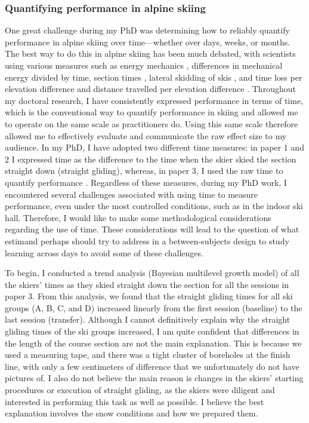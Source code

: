 \subsubsection{Quantifying performance in alpine skiing}
One great challenge during my PhD was determining how to reliably quantify performance in alpine skiing over time—whether over days, weeks, or months. The best way to do this in alpine skiing has been much debated, with scientists using various measures such as energy mechanics \cite{supej_differential_2008, supej_how_2010, supej_mechanical_2011} , differences in mechanical energy divided by time, section times \cite{supej_relations_2006}, lateral skidding of skis \cite{kirby_development_2009}, and time loss per elevation difference and distance travelled per elevation difference \cite{federolf_quantifying_2012}. Throughout my doctoral research, I have consistently expressed performance in terms of time, which is the conventional way to quantify performance in skiing and allowed me to operate on the same scale as practitioners do. Using this same scale therefore allowed me to effectively evaluate and communicate the raw effect size to my audience. In my PhD, I have adopted two different time measures: in paper 1 and 2 I expressed time as the difference to the time when the skier skied the section straight down (straight gliding), whereas, in paper 3, I used the raw time to quantify performance . Regardless of these measures, during my PhD work, I encountered several challenges associated with using time to measure performance, even under the most controlled conditions, such as in the indoor ski hall. Therefore, I would like to make some methodological considerations regarding the use of time. These considerations will lead to the question of what estimand perhaps should try to address in a between-subjects design to study learning across days to avoid some of these challenges.

To begin, I conducted a trend analysis (Bayesian multilevel growth model) of all the skiers' times as they skied straight down the section for all the sessions in paper 3. From this analysis, we found that the straight gliding times for all ski groups (A, B, C, and D) increased linearly from the first session (baseline) to the last session (transfer). Although I cannot definitively explain why the straight gliding times of the ski groups increased, I am quite confident that differences in the length of the course section are not the main explanation. This is because we used a measuring tape, and there was a tight cluster of boreholes at the finish line, with only a few centimeters of difference that we unfortunately do not have pictures of. I also do not believe the main reason is changes in the skiers' starting procedures or execution of straight gliding, as the skiers were diligent and interested in performing this task as well as possible. I believe the best explanation involves the snow conditions and how we prepared them.  

